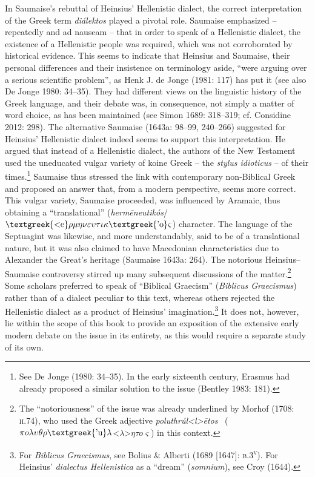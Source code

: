 \documentclass[12pt]{article}
\newenvironment{styleStandard}{\renewcommand\baselinestretch{1.25}\setlength\leftskip{0in}\setlength\rightskip{0in}\setlength\parindent{0.1972in}\setlength\parfillskip{0pt plus 1fil}\setlength\parskip{0in plus 1pt}\writerlistparindent\writerlistleftskip\leavevmode\normalfont\normalsize\writerlistlabel\ignorespaces}{\unskip\vspace{0in plus 1pt}\par}
\newcommand\writerlistleftskip{}
\newcommand\writerlistparindent{}
\newcommand\writerlistlabel{}
\begin{document}
\begin{styleStandard}
In Saumaise’s rebuttal of Heinsius’ Hellenistic dialect, the correct interpretation of the Greek term \textit{diálektos }played a pivotal role. Saumaise emphasized – repeatedly and ad nauseam – that in order to speak of a Hellenistic dialect, the existence of a Hellenistic people was required, which was not corroborated by historical evidence. This seems to indicate that Heinsius and Saumaise, their personal differences and their insistence on terminology aside, “were arguing over a serious scientific problem”, as Henk J. de Jonge (1981: 117) has put it (see also De Jonge 1980: 34–35). They had different views on the linguistic history of the Greek language, and their debate was, in consequence, not simply a matter of word choice, as has been maintained (see Simon 1689: 318–319; cf. Considine 2012: 298). The alternative Saumaise (1643a: 98–99, 240–266) suggested for Heinsius’ Hellenistic dialect indeed seems to support this interpretation. He argued that instead of a Hellenistic dialect, the authors of the New Testament used the uneducated vulgar variety of koine Greek – the \textit{stylus idioticus} – of their times.\footnote{ See De Jonge (1980: 34–35). In the early sixteenth century, Erasmus had already proposed a similar solution to the issue (Bentley 1983: 181).} Saumaise thus stressed the link with contemporary non-Biblical Greek and proposed an answer that, from a modern perspective, seems more correct. This vulgar variety, Saumaise proceeded, was influenced by Aramaic, thus obtaining a “translational” (\textit{herm\=eneutikós}/$\text{\textgreek{<e}}\rho \mu \eta \nu \varepsilon \upsilon \tau \iota \kappa \text{\textgreek{'o}}\varsigma $) character. The language of the Septuagint was likewise, and more understandably, said to be of a translational nature, but it was also claimed to have Macedonian characteristics due to Alexander the Great’s heritage (Saumaise 1643a: 264). The notorious Heinsius–Saumaise controversy stirred up many subsequent discussions of the matter.\footnote{ The “notoriousness” of the issue was already underlined by Morhof (1708: \textsc{ii.}74), who used the Greek adjective \textit{poluthrúl{\textless}l{\textgreater}\=etos }\ ($\pi o\lambda \upsilon \theta \rho \text{\textgreek{'u}}\lambda ${\textless}$\lambda ${\textgreater}$\eta \tau o\varsigma $) in this context.} Some scholars preferred to speak of “Biblical Graecism” (\textit{Biblicus Graecismus}) rather than of a dialect peculiar to this text, whereas others rejected the Hellenistic dialect as a product of Heinsius’ imagination.\footnote{ For \textit{Biblicus Graecismus}, see Bolius \& Alberti (1689 [1647]: \textsc{b.3}\textsc{\textsuperscript{v}}). For Heinsius’ \textit{dialectus Hellenistica} as a “dream” (\textit{somnium}), see Croy (1644).} It does not, however, lie within the scope of this book to provide an exposition of the extensive early modern debate on the issue in its entirety, as this would require a separate study of its own.
\end{styleStandard}
\end{document}
